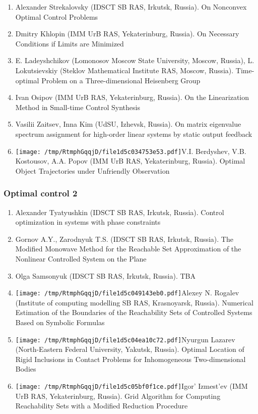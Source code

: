 \documentclass[
]{article}
\providecommand{\tightlist}{%
  \setlength{\itemsep}{0pt}\setlength{\parskip}{0pt}}
\begin{document}
\begin{enumerate}
\def\labelenumi{\arabic{enumi}.}
\tightlist
\item
  Alexander Strekalovsky (IDSCT SB RAS, Irkutsk, Russia). On Nonconvex
  Optimal Control Problems
\item
  Dmitry Khlopin (IMM UrB RAS, Yekaterinburg, Russia). On Necessary
  Conditions if Limits are Minimized
\item
  E. Ladeyshchikov (Lomonosov Moscow State University, Moscow, Russia),
  L. Lokutsievskiy (Steklov Mathematical Institute RAS, Moscow, Russia).
  Time-optimal Problem on a Three-dimensional Heisenberg Group
\item
  Ivan Osipov (IMM UrB RAS, Yekaterinburg, Russia). On the Linearization
  Method in Small-time Control Synthesis
\item
  Vasilii Zaitsev, Inna Kim (UdSU, Izhevsk, Russia). On matrix
  eigenvalue spectrum assignment for high-order linear systems by static
  output feedback
\item
  \protect\texttt{[image: /tmp/RtmphGqqjD/file1d5c034753e53.pdf]}V.I.
  Berdyshev, V.B. Kostousov, A.A. Popov (IMM UrB RAS, Yekaterinburg,
  Russia). Optimal Object Trajectories under Unfriendly Observation
\end{enumerate}

\hypertarget{oc2}{%
\subsubsection{Optimal control 2}\label{oc2}}

\begin{enumerate}
\def\labelenumi{\arabic{enumi}.}
\tightlist
\item
  Alexander Tyatyushkin (IDSCT SB RAS, Irkutsk, Russia). Control
  optimization in systems with phase constraints
\item
  Gornov A.Y., Zarodnyuk T.S. (IDSCT SB RAS, Irkutsk, Russia). The
  Modiﬁed Monowave Method for the Reachable Set Approximation of the
  Nonlinear Controlled System on the Plane
\item
  Olga Samsonyuk (IDSCT SB RAS, Irkutsk, Russia). TBA
\item
  \protect\texttt{[image: /tmp/RtmphGqqjD/file1d5c049143eb0.pdf]}Alexey
  N. Rogalev (Institute of computing modelling SB RAS, Krasnoyarsk,
  Russia). Numerical Estimation of the Boundaries of the Reachability
  Sets of Controlled Systems Based on Symbolic Formulas
\item
  \protect\texttt{[image: /tmp/RtmphGqqjD/file1d5c04ea10c72.pdf]}Nyurgun
  Lazarev (North-Eastern Federal University, Yakutsk, Russia). Optimal
  Location of Rigid Inclusions in Contact Problems for Inhomogeneous
  Two-dimensional Bodies
\item
  \protect\texttt{[image: /tmp/RtmphGqqjD/file1d5c05bf0f1ce.pdf]}Igor'
  Izmest'ev (IMM UrB RAS, Yekaterinburg, Russia). Grid Algorithm for
  Computing Reachability Sets with a Modified Reduction Procedure
\end{enumerate}
\end{document}
